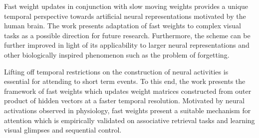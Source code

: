 \documentclass[11pt,letterpaper]{article}
\begin{document}
Fast weight updates in conjunction with slow moving weights provides a unique temporal perspective towards artificial neural representations motivated by the human brain. The work presents adaptation of fast weights to complex visual tasks as a possible direction for future research. Furthermore, the scheme can be further improved in light of its applicability to larger neural representations and other biologically inspired phenomenon such as the problem of forgetting.

Lifting off temporal restrictions on the construction of neural activities is essential for attending to short term events. To this end, the work presents the framework of fast weights which updates weight matrices constructed from outer product of hidden vectors at a faster temporal resolution. Motivated by neural activations observed in physiology, fast weights present a suitable mechanism for attention which is empirically validated on associative retrieval tasks and learning visual glimpses and sequential control.
\end{document}
